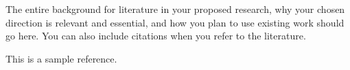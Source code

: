 The entire background for literature in your proposed research, why your chosen direction is relevant and essential, and how you plan to use existing work should go here. You can also include citations when you refer to the literature.

This \cite{lesk:1977} is a sample reference.